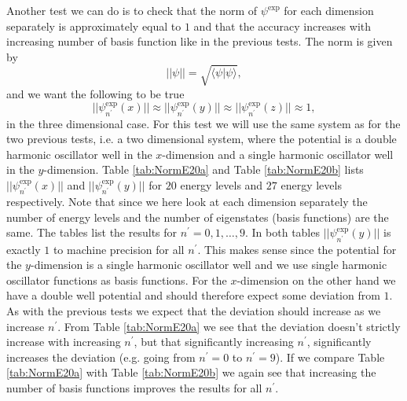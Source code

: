 \documentclass[../main.tex]{subfiles}
\begin{document}
Another test we can do is to check that the norm of $\psi^\textrm{exp}$ for each dimension separately is approximately equal to $1$ and that the accuracy increases with increasing number of basis function like in the previous tests. The norm is given by
\begin{equation}
    ||\psi|| = \sqrt{\langle \psi|\psi \rangle},
\end{equation}
and we want the following to be true
\begin{equation}
    ||\psi_{n^\prime}^\textrm{exp}(x)|| \approx ||\psi_{n^\prime}^\textrm{exp}(y)|| \approx ||\psi_{n^\prime}^\textrm{exp}(z)|| \approx 1,
\end{equation}
in the three dimensional case. For this test we will use the same system as for the two previous tests, i.e. a two dimensional system, where the potential is a double harmonic oscillator well in the $x$-dimension and a single harmonic oscillator well in the $y$-dimension. Table \ref{tab:NormE20a} and Table \ref{tab:NormE20b} lists $||\psi_{n^\prime}^\textrm{exp}(x)||$ and $||\psi_{n^\prime}^\textrm{exp}(y)||$ for $20$ energy levels and $27$ energy levels respectively. Note that since we here look at each dimension separately the number of energy levels and the number of eigenstates (basis functions) are the same. The tables list the results for $n^\prime = 0,1,\dots,9$. In both tables $||\psi_{n^\prime}^\textrm{exp}(y)||$ is exactly $1$ to machine precision for all $n^\prime$. This makes sense since the potential for the $y$-dimension is a single harmonic oscillator well and we use single harmonic oscillator functions as basis functions. For the $x$-dimension on the other hand we have a double well potential and should therefore expect some deviation from $1$. As with the previous tests we expect that the deviation should increase as we increase $n^\prime$. From Table \ref{tab:NormE20a} we see that the deviation doesn't strictly increase with increasing $n^\prime$, but that significantly increasing $n^\prime$, significantly increases the deviation (e.g. going from $n^\prime = 0$ to $n^\prime = 9$). If we compare Table \ref{tab:NormE20a} with Table \ref{tab:NormE20b} we again see that increasing the number of basis functions improves the results for all $n^\prime$.
\end{document}
